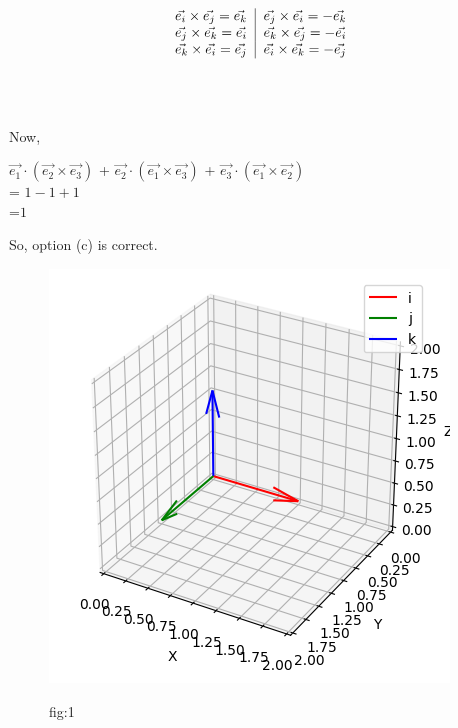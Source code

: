 \documentclass[12pt]{article}
\begin{document}
\[
\begin{aligned}
\begin{tabular} {l|l}
$\vec{e_i} \times \vec{e_j} = \vec{e_k}$ &$\vec{e_j} \times \vec{e_i} = -\vec{e_k}$ \\
$\vec{e_j} \times \vec{e_k} = \vec{e_i}$ & $\vec{e_k} \times \vec{e_j} = -\vec{e_i}$ \\
$\vec{e_k} \times \vec{e_i} = \vec{e_j}$ &$\vec{e_i} \times \vec{e_k} = -\vec{e_j}$ \\
\end{tabular}
\end{aligned}
\] \\
 \\
\\
Now,
\begin{center}  
$\vec{e_1} \cdot (\vec{e_2} \times \vec{e_3})$ + $\vec{e_2} \cdot (\vec{e_1} \times \vec{e_3})$ + $\vec{e_3} \cdot (\vec{e_1} \times \vec{e_2} )$ \\
    = $ 1 - 1 + 1 $\\
    =$1$\\
\end{center}
So, option (c) is correct.

\begin{figure}[H]
        \centering
  \includegraphics[width=\columnwidth]{figs/unit_vec.png}
                \label{fig:12/10/5/18}
         \caption{fig:1}
               \end{figure}
\end{document}
